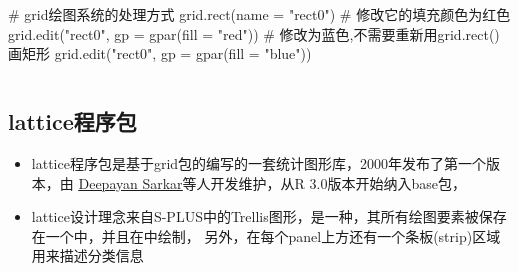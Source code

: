 \begin{frame}[t,fragile]{\subsecname}{}
\begin{overlayarea}{\textwidth}{\textheight}
\begin{onlyenv}
\begin{columns}
  \begin{column}[t]{.5\textwidth}
    \begin{rcode}
# grid绘图系统的处理方式
grid.rect(name = "rect0")
# 修改它的填充颜色为红色
grid.edit("rect0", gp = gpar(fill = "red"))
# 修改为蓝色,不需要重新用grid.rect()画矩形
grid.edit("rect0", gp = gpar(fill = "blue"))
    \end{rcode} 
  \end{column}
\end{columns} 
\end{onlyenv}

\end{overlayarea}
\end{frame} 

\subsection{lattice程序包}
\begin{frame}[t,fragile]{\subsecname}{}
\begin{itemize}
\item lattice程序包是基于grid包的编写的一套统计图形库，2000年发布了第一个版本，由
\href{https://www.isid.ac.in/~deepayan/}{\uline{Deepayan Sarkar}}等人开发维护，从R 3.0版本开始纳入base包，
\item lattice设计理念来自S-PLUS中的Trellis图形，是一种，其所有绘图要素被保存在一个中，并且在中绘制，
另外，在每个panel上方还有一个条板(strip)区域用来描述分类信息
\end{itemize}

\vspace{-8pt}
\begin{overlayarea}{\textwidth}{\textheight}

\end{overlayarea}  
\end{frame} 

